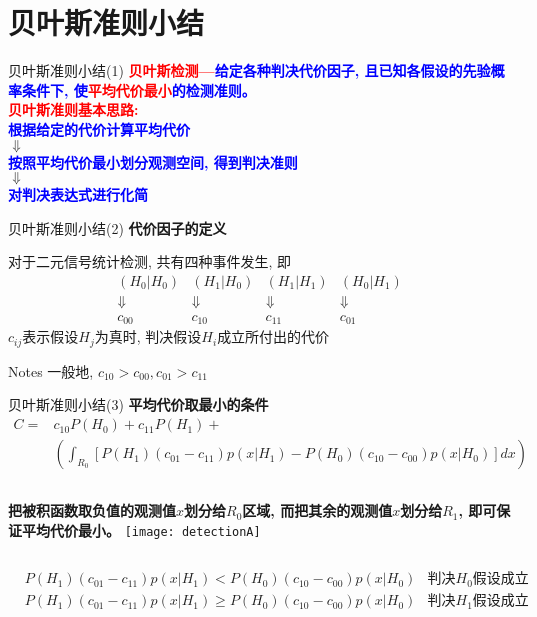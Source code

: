 \section{贝叶斯准则小结}

\begin{frame}{贝叶斯准则小结(1)}
\textbf{\textcolor{red}{贝叶斯检测---}\textcolor{blue}{给定各种判决代价因子, 且已知各假设的先验概率条件下, 使\textcolor{red}{平均代价最小}的检测准则。}}\\

\bigskip
\textbf{\textcolor{red}{贝叶斯准则基本思路:}}\\
\centering
\textcolor{blue}{\textbf{根据给定的代价计算平均代价}}\\
$\Downarrow$\\
\textcolor{blue}{\textbf{按照平均代价最小划分观测空间, 得到判决准则}}\\
$\Downarrow$\\
\textcolor{blue}{\textbf{对判决表达式进行化简}}
\end{frame}

\begin{frame}{贝叶斯准则小结(2)}
\textbf{代价因子的定义}
\begin{block}{对于二元信号统计检测, 共有四种事件发生, 即}
	$$
	\begin{array}{cccc}
	(H_0|H_0) & (H_1|H_0) & (H_1|H_1) & (H_0|H_1)\\
	\Downarrow & \Downarrow & \Downarrow & \Downarrow\\
	c_{00} & c_{10} & c_{11} & c_{01}
	\end{array}
	$$
	$c_{ij}$表示假设$H_j$为真时, 判决假设$H_i$成立所付出的代价
\end{block}
\begin{block}{Notes}
	一般地, $c_{10}>c_{00}, c_{01}>c_{11}$
\end{block}
\end{frame}

\begin{frame}[shrink]{贝叶斯准则小结(3)}
\textbf{平均代价取最小的条件}
\begin{align*}
C=&c_{10}P(H_0)+c_{11}P(H_1)+\\
&\left(\int_{R_0}\left[P({H_1})(c_{01}-c_{11})p(x|H_1)-P(H_0)(c_{10}-c_{00})p(x|H_0)\right]dx \right)
\end{align*}
\begin{columns}
	\textbf{把被积函数取负值的观测值$x$划分给$R_0$区域, 而把其余的观测值$x$划分给$R_1$, 即可保证平均代价最小。}
	\texttt{[image: detectionA]}
\end{columns}
\begin{align*}
&P({H_1})(c_{01}-c_{11})p(x|H_1)< P(H_0)(c_{10}-c_{00})p(x|H_0)&\textbf{判决$H_0$假设成立}\\
&P({H_1})(c_{01}-c_{11})p(x|H_1)\ge P(H_0)(c_{10}-c_{00})p(x|H_0)&\textbf{判决$H_1$假设成立}
\end{align*}
\end{frame}

